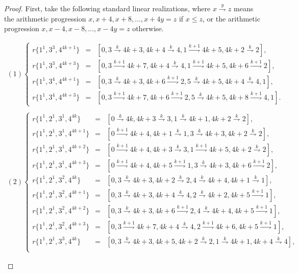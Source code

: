 \documentclass{amsart}
\theoremstyle{definition}
\numberwithin{equation}{section}
\newcommand{\arq}[1]{\stackrel{#1}{\rightharpoondown}}
\begin{document}
\begin{proof}
First, take the following standard linear realizations,
where $x\arq{y} z$ means the arithmetic progression $x,  x+4, x+8,\ldots,x+4y=z$ if $x\leq z$,
or the arithmetic progression $x,x-4,x-8,\ldots,x-4y=z$ otherwise.

\begin{footnotesize}
$$\begin{array}{l}
      (1) \left\{\begin{array}{rcl}
 r\{1^1, 3^3,4^{4k+1} \}  & = & [0,3\arq{k} 4k+3, 4k+4\arq{k} 4, 1 \arq{k+1} 4k+5, 4k+2 \arq{k} 2],  \\
 r\{1^1, 3^3,4^{4k+3} \}  & = & [0,3\arq{k+1} 4k+7, 4k+4\arq{k} 4, 1 \arq{k+1} 4k+5, 4k+6 \arq{k+1} 2],\\
 r\{1^1, 3^4,4^{4k+1} \}  & = & [ 0,3\arq{k} 4k+3, 4k+6\arq{k+1} 2, 5 \arq{k} 4k+5, 4k+4 \arq{k} 4,1], \\
 r\{1^1, 3^4,4^{4k+3} \}  & = & [ 0,3\arq{k+1} 4k+7, 4k+6\arq{k+1} 2, 5 \arq{k} 4k+5, 4k+8 \arq{k+1} 4,1].
      \end{array}\right.\\[12pt]
   \end{array}$$
$$\begin{array}{l}
         (2) \left\{\begin{array}{rcl}
r\{1^1,2^1,3^1,4^{4k} \} & = & [0\arq{k} 4k, 4k+3\arq{k} 3, 1 \arq{k} 4k+1, 4k+2\arq{k}2 ],\\
r\{1^1,2^1,3^1,4^{4k+1} \} & = & [0\arq{k+1} 4k+4, 4k+1 \arq{k} 1, 3\arq{k} 4k+3, 4k+2\arq{k} 2 ],  \\
r\{1^1,2^1,3^1,4^{4k+2} \} & = & [0\arq{k+1} 4k+4, 4k+3 \arq{k} 3, 1 \arq{k+1} 4k+5, 4k+2 \arq{k} 2  ], \\
r\{1^1,2^1,3^1,4^{4k+3} \} & = & [0\arq{k+1} 4k+4, 4k+5\arq{k+1} 1, 3 \arq{k} 4k+3, 4k+6 \arq{k+1} 2],\\
 r\{1^1, 2^1, 3^2,4^{4k} \}  & = & [0,3\arq{k} 4k+3, 4k+2\arq{k} 2, 4 \arq{k} 4k+4, 4k+1\arq{k} 1],\\
 r\{1^1, 2^1, 3^2,4^{4k+1} \}  & = & [0,3\arq{k} 4k+3, 4k+4\arq{k} 4, 2 \arq{k} 4k+2, 4k+5\arq{k+1} 1],\\
 r\{1^1, 2^1, 3^2,4^{4k+2} \}  & = & [0,3\arq{k} 4k+3, 4k+6\arq{k+1} 2, 4 \arq{k} 4k+4, 4k+5\arq{k+1} 1],\\
 r\{1^1, 2^1, 3^2,4^{4k+3} \}  & = & [0,3\arq{k+1} 4k+7, 4k+4\arq{k} 4, 2 \arq{k+1} 4k+6, 4k+5\arq{k+1} 1],\\
r\{1^1,2^1,3^3,4^{4k} \} & = & [0,3\arq{k} 4k+3, 4k+5, 4k+2\arq{k} 2, 1 \arq{k} 4k+1, 4k+4\arq{k} 4 ],\\

\end{array}
\end{array}$$
\end{footnotesize}
\end{proof}
\end{document}
